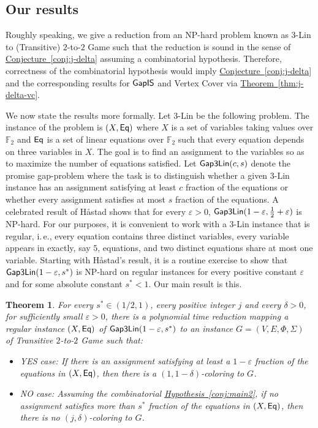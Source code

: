 \documentclass[11pt]{article}
\numberwithin{equation}{section}
\newtheorem{theorem}{Theorem}[section]
\theoremstyle{definition}
\theoremstyle{plain}
\newcommand{\ie}{i.\,e.}
\newcommand{\expref}[2]{\hyperref[#2]{#1~\ref{#2}}}
\newcommand\eps{\varepsilon}
\begin{document}
\subsection{Our results}

Roughly speaking, we give a reduction from an NP-hard problem known as $3$-Lin to
(Transitive) $2$-to-$2$ Game such that
the reduction is sound in the sense of \expref{Conjecture}{conj:j-delta} assuming a
combinatorial hypothesis. Therefore, correctness of the combinatorial hypothesis would
imply \expref{Conjecture}{conj:j-delta}
and the corresponding results for ${\sf GapIS}$ and Vertex Cover via
\expref{Theorem}{thm:j-delta-vc}.


We now state the results more formally. Let $3$-Lin be the following problem. The instance of the problem is
$(X, {\sf Eq})$ where $X$ is a set of variables taking values over ${\mathbb F}_2$ and ${\sf Eq}$ is a set of linear equations over
${\mathbb F}_2$ such that every equation depends on three variables in $X$. The goal is to find an assignment to the variables
so as to maximize the number of equations satisfied. Let ${\sf Gap3Lin}(c, s)$ denote the promise gap-problem
where the task is to distinguish whether a given $3$-Lin instance has an assignment satisfying at least $c$ fraction of
the equations or whether every assignment satisfies at most $s$ fraction of the equations.
A celebrated result of H\aa stad \cite{Has01} shows that for every  $\eps>0$, %
 ${\sf Gap3Lin}(1-\eps, \frac{1}{2}+\eps)$ is NP-hard. For our purposes, it is convenient to work with a $3$-Lin
 instance that is regular, \ie, every equation contains three distinct variables,  every variable appears in exactly, say $5$,
 equations, and two distinct equations share at most one variable.
 Starting with H\aa stad's result, it is a routine exercise to show that ${\sf Gap3Lin}(1-\eps, s^*)$ is NP-hard on regular instances for every positive
 constant $\eps$ and for some absolute constant $s^* < 1$.
 Our main result is this. %


\begin{theorem}\label{thm:main} For every $s^{*}\in (1/2,1)$, every positive integer $j$ and every
$\delta>0$, for sufficiently small $\eps>0$,
there is a
 polynomial time reduction mapping a regular instance
$(X, {\sf Eq})$ of ${\sf Gap3Lin}(1-\eps, s^*)$
to an instance $G=(V,E,\Phi,\Sigma)$ of Transitive $2$-to-$2$ Game
such that:
\begin{itemize}
\item
YES case: If there is an assignment satisfying at least
a  %
$1-\eps$ fraction of the equations
in $(X, {\sf Eq})$, then
there is a $(1,1-\delta)$-coloring to $G$.

\item NO case: Assuming the combinatorial \expref{Hypothesis}{conj:main2},
if no assignment satisfies more than $s^*$ fraction of the equations in $(X, {\sf Eq})$,
then there is no $(j,\delta)$-coloring to $G$.
\end{itemize}
\end{theorem}
\end{document}

